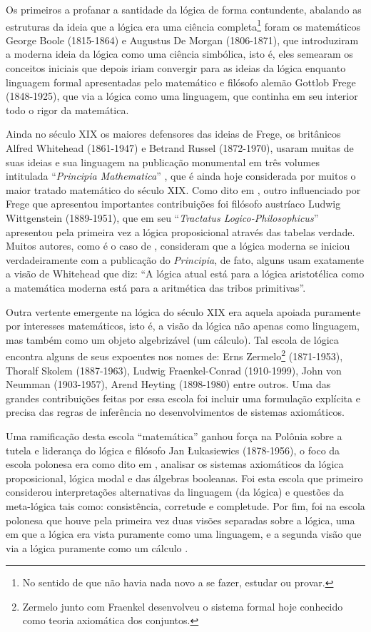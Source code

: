 Os primeiros a profanar a santidade da lógica de forma contundente, abalando as estruturas da ideia que a lógica era uma ciência completa\footnote{No sentido de que não havia nada novo a se fazer, estudar ou provar.} foram os matemáticos George Boole (1815-1864) e Augustus De Morgan (1806-1871), que introduziram a moderna ideia da lógica como uma ciência simbólica, isto é, eles semearam os conceitos iniciais que depois iriam convergir para as ideias da lógica enquanto linguagem formal apresentadas pelo matemático e filósofo alemão Gottlob Frege (1848-1925), que via a lógica como uma linguagem, que continha em seu interior todo o rigor da matemática.

Ainda no século XIX os maiores defensores das ideias de Frege, os britânicos Alfred Whitehead (1861-1947) e Betrand Russel (1872-1970),  usaram muitas de suas ideias e sua linguagem na publicação monumental em três volumes intitulada ``\textit{Principia Mathematica}'' \cite{russel1910principia}, que é ainda hoje considerada por muitos o maior tratado matemático do século XIX. Como dito em \cite{benja-Logica}, outro influenciado por Frege que apresentou importantes contribuições foi filósofo austríaco Ludwig Wittgenstein (1889-1951), que em seu ``\textit{Tractatus Logico-Philosophicus}'' apresentou pela primeira vez a lógica proposicional através das tabelas verdade. Muitos autores, como é o caso de \cite{abe2002-logica}, consideram que a lógica moderna se iniciou verdadeiramente com a publicação do \textit{Principia}, de fato, alguns usam exatamente a visão de Whitehead que diz: ``A lógica atual está para a lógica aristotélica como a matemática moderna está para a aritmética das tribos primitivas''.

Outra vertente emergente na lógica do século XIX era aquela apoiada puramente por interesses matemáticos, isto é, a visão da lógica não apenas como linguagem, mas também como um objeto algebrizável (um cálculo). Tal escola de lógica encontra alguns de seus expoentes nos nomes de: Erns Zermelo\footnote{Zermelo junto com Fraenkel desenvolveu o sistema formal hoje conhecido como teoria axiomática dos conjuntos.} (1871-1953), Thoralf Skolem (1887-1963), Ludwig Fraenkel-Conrad (1910-1999), John von Neumman (1903-1957), Arend Heyting (1898-1980) entre outros. Uma das grandes contribuições feitas por essa escola foi incluir uma formulação explícita e precisa das regras de inferência no desenvolvimentos de sistemas axiomáticos.

Uma ramificação desta escola ``matemática'' ganhou força na Polônia sobre a tutela e liderança do lógica e filósofo Jan \L{}ukasiewics (1878-1956), o foco da escola polonesa era como dito em \cite{benja-Logica}, analisar os sistemas axiomáticos da lógica proposicional, lógica modal e das álgebras booleanas. Foi esta escola que primeiro considerou interpretações alternativas da linguagem (da lógica) e questões da meta-lógica tais como: consistência, corretude e completude. Por fim, foi na escola polonesa que houve pela primeira vez duas visões separadas sobre a lógica, uma em que a lógica era vista puramente como uma linguagem, e a segunda visão que via a lógica puramente como um cálculo \cite{benja-Logica}.

